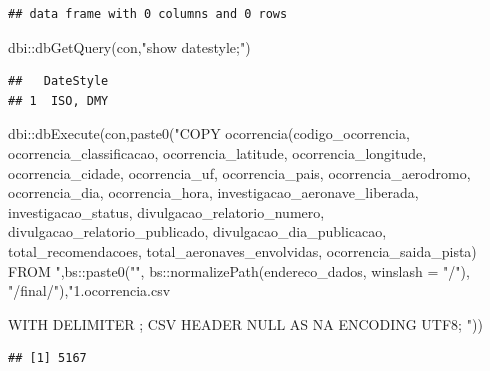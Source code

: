 \documentclass[
]{article}
\newenvironment{Shaded}{\begin{snugshade}}{\end{snugshade}}
\newcommand{\AttributeTok}[1]{\textcolor[rgb]{0.77,0.63,0.00}{#1}}
\newcommand{\FunctionTok}[1]{\textcolor[rgb]{0.00,0.00,0.00}{#1}}
\newcommand{\NormalTok}[1]{#1}
\newcommand{\SpecialCharTok}[1]{\textcolor[rgb]{0.00,0.00,0.00}{#1}}
\newcommand{\StringTok}[1]{\textcolor[rgb]{0.31,0.60,0.02}{#1}}
\begin{document}
\begin{verbatim}
## data frame with 0 columns and 0 rows
\end{verbatim}

\begin{Shaded}
\begin{Highlighting}[]
\NormalTok{dbi}\SpecialCharTok{::}\FunctionTok{dbGetQuery}\NormalTok{(con,}\StringTok{"show datestyle;"}\NormalTok{)}
\end{Highlighting}
\end{Shaded}

\begin{verbatim}
##   DateStyle
## 1  ISO, DMY
\end{verbatim}

\begin{Shaded}
\begin{Highlighting}[]
\NormalTok{dbi}\SpecialCharTok{::}\FunctionTok{dbExecute}\NormalTok{(con,}\FunctionTok{paste0}\NormalTok{(}\StringTok{"COPY ocorrencia(codigo\_ocorrencia,}
\StringTok{  ocorrencia\_classificacao,}
\StringTok{  ocorrencia\_latitude,}
\StringTok{  ocorrencia\_longitude,}
\StringTok{  ocorrencia\_cidade,}
\StringTok{  ocorrencia\_uf,}
\StringTok{  ocorrencia\_pais,}
\StringTok{  ocorrencia\_aerodromo,}
\StringTok{  ocorrencia\_dia,}
\StringTok{  ocorrencia\_hora,}
\StringTok{  investigacao\_aeronave\_liberada,}
\StringTok{  investigacao\_status,}
\StringTok{  divulgacao\_relatorio\_numero,}
\StringTok{  divulgacao\_relatorio\_publicado,}
\StringTok{  divulgacao\_dia\_publicacao,}
\StringTok{  total\_recomendacoes,}
\StringTok{  total\_aeronaves\_envolvidas,}
\StringTok{  ocorrencia\_saida\_pista)}
\StringTok{FROM "}\NormalTok{,bs}\SpecialCharTok{::}\FunctionTok{paste0}\NormalTok{(}\StringTok{"\textquotesingle{}"}\NormalTok{,}
\NormalTok{              bs}\SpecialCharTok{::}\FunctionTok{normalizePath}\NormalTok{(endereco\_dados,}
                            \AttributeTok{winslash =} \StringTok{"/"}\NormalTok{),}
              \StringTok{"/final/"}\NormalTok{),}\StringTok{"1.ocorrencia.csv\textquotesingle{}}

\StringTok{WITH DELIMITER \textquotesingle{};\textquotesingle{}}
\StringTok{CSV}
\StringTok{HEADER}
\StringTok{NULL AS \textquotesingle{}NA\textquotesingle{}}
\StringTok{ENCODING \textquotesingle{}UTF8\textquotesingle{};}
\StringTok{"}\NormalTok{))}
\end{Highlighting}
\end{Shaded}

\begin{verbatim}
## [1] 5167
\end{verbatim}
\end{document}

